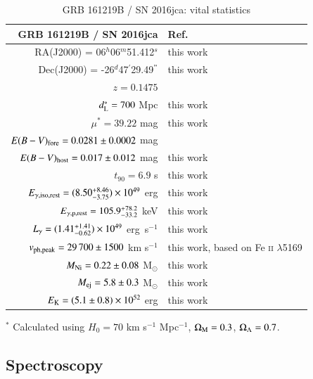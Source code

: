 \documentclass[traditabstract,longauth]{aa}
\begin{document}
\begin{table}
\centering
\setlength{\tabcolsep}{4.0pt}
\setlength{\extrarowheight}{3pt}
\caption{GRB 161219B / SN 2016jca: vital statistics}
\label{table:GRB_vitals}
\begin{tabular}{rl}
\hline			
GRB 161219B / SN 2016jca	&	Ref.	\\
\hline			
RA(J2000) = 06$^{h}$06$^{m}$51.412$^{s}$ 	&	this work	\\
Dec(J2000) = -26$^{d}$47$^{'}$29.49$^{"}$	&	this work	\\
$z=0.1475$	&	\citet{Tanvir16}	\\
$d_{\rm L}^{*} =  700$ Mpc	&	this work	\\
$\mu^{*} = 39.22$ mag	&	this work	\\
$E(B-V)_{\rm fore} = 0.0281 \pm 0.0002$ mag	&	\citet{SchFink11}	\\
$E(B-V)_{\rm host} = 0.017 \pm 0.012$ mag	&	this work	\\
$t_{90} =6.9$ s	& this work	\\
$E_{\rm \gamma, iso, rest} = (8.50_{-3.75}^{+8.46}) \times 10^{49}$ erg	&	this work	\\
$E_{\rm \gamma, p,rest} = 105.9_{-33.2}^{+78.2}$ keV	&	this work	\\
$L_{\rm \gamma} = (1.41_{-0.62}^{+1.41}) \times 10^{49}$ erg~s$^{-1}$ & this work \\
$v_{\rm ph, peak} = 29\,700\pm 1500$ km s$^{-1}$	&	this work, based on Fe \textsc{ii} $\lambda$5169	\\
$M_{\rm Ni} = 0.22 \pm 0.08$ M$_{\odot}$	&	this work	\\
$M_{\rm ej} = 5.8 \pm 0.3$ M$_{\odot}$	&	this work	\\
$E_{\rm K} = (5.1 \pm 0.8) \times 10^{52}$ erg	&	this work	\\
\hline					
\end{tabular}
\begin{flushleft}
$^{*}$ Calculated using $H_{0} = 70$ km s$^{-1}$ Mpc$^{-1}$, $\Omega_{\rm M} = 0.3$, $\Omega_{\rm \Lambda} = 0.7$. \\ 
\end{flushleft}
\end{table}





\subsection{Spectroscopy}
\end{document}
